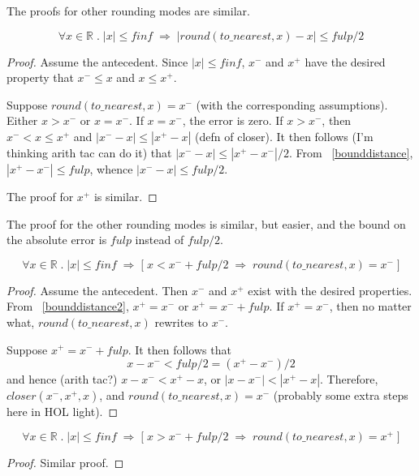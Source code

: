 \documentclass{article}
\begin{document}
The proofs for other rounding modes are similar.

\begin{thm}
\label{abserror}
\begin{equation*}
\forall x \in \mathbb{R} \; . \; |x| \leq finf \; \Longrightarrow \;
|round(to\_nearest, x) - x| \leq fulp/2
\end{equation*}
\begin{proof} Assume the antecedent. Since $|x| \leq finf$, 
$x^-$ and $x^+$ have the desired property that $x^- \leq x$ and
$x \leq x^+$.

Suppose $round(to\_nearest,x) = x^-$ (with the corresponding assumptions).
Either $x > x^-$ or $x = x^-$. If $x = x^-$, the error is zero. If $x > x^-$,
then $x^- < x \leq x^+$ and $|x^- - x| \leq |x^+ - x|$ (defn of closer). 
It then follows (I'm thinking arith tac can do it) that 
$|x^-  - x| \leq |x^+ - x^-| / 2$. From ~\ref{bounddistance}, 
$|x^+ - x^-| \leq fulp$, whence $|x^- - x| \leq fulp/2$.

The proof for $x^+$ is similar.
\end{proof}
\end{thm}

The proof for the other rounding modes is similar, but easier, and the
bound on the absolute error is $fulp$ instead of $fulp/2$.

\begin{lem}
\label{rnddown}
\begin{equation*}
\forall x \in \mathbb{R} \; . \; |x| \leq finf \;
\Longrightarrow \;
\big [ \; x < x^- + fulp/2 \; \Longrightarrow \; round(to\_nearest, x) = x^-
\; \big ]
\end{equation*}
\begin{proof} Assume the antecedent. Then $x^-$ and $x^+$ exist with the
desired properties. From ~\ref{bounddistance2}, $x^+ = x^-$ or $x^+ =
x^- + fulp$. If $x^+ = x^-$, then no matter what, $round(to\_nearest,x)$
rewrites to $x^-$.

Suppose $x^+ = x^- + fulp$. It then follows that
\begin{equation*}
x - x^- < fulp/2 = (x^+ - x^-)/2
\end{equation*}
and hence (arith tac?) $x - x^- < x^+ - x$, or $|x - x^-| < |x^+ - x|$. 
Therefore, $closer(x^-, x^+, x)$, and $round(to\_nearest, x) = x^-$ 
(probably some extra steps here in HOL light).
\end{proof}
\end{lem}

\begin{lem}
\label{rndup}
\begin{equation*}
\forall x \in \mathbb{R} \; . \; |x| \leq finf \;
\Longrightarrow \;
\big [ \; x > x^- + fulp/2 \; \Longrightarrow \; round(to\_nearest, x) = x^+
\; \big ]
\end{equation*}
\begin{proof} Similar proof.
\end{proof}
\end{lem}
\end{document}
